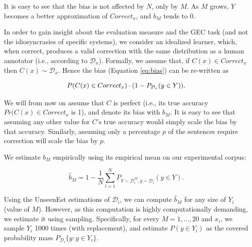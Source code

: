 \documentclass[letter,11pt]{article}
\begin{document}
It is easy to see that the bias is not affected by $N$, only by $M$.
As $M$ grows, $Y$ becomes a better approximation of $Correct_x$, and $b_M$ tends to 0.

In order to gain insight about the evaluation measure and the GEC task
(and not the idiosyncrasies of specific systems), we consider an idealized learner,
which, when correct, produces a valid correction with the same
distribution as a human annotator (i.e., according to $\mathcal{D}_x$).
Formally, we assume that, if $C(x) \in Correct_x$ then $C(x) \sim \mathcal{D}_x$.
Hence the bias (Equation \ref{eq:bias}) can be re-written as

\begin{small}
\begin{equation}
  \centering
  P(C(x) \in Correct_x) \cdot (1 - P_{\mathcal{D}_x}(y \in Y)).
\end{equation}
\end{small}

We will from now on assume that $C$ is perfect (i.e., its true accuracy $Pr(C(x) \in Correct_x$ is 1),
and denote its bias with $b_M$.
It is easy to see that assuming any other value for $C$'s true accuracy
would simply scale the bias by that accuracy.
Similarly, assuming only a percentage $p$ of the sentences require correction
will scale the bias by $p$.



We estimate $b_M$ empirically using its empirical mean on our experimental corpus:

\begin{small}
  \begin{equation}
    \hat{b}_M = 1 - \frac{1}{N}\sum_{i=1}^N P_{Y \sim \mathcal{D}_i^M, y \sim \mathcal{D}_i}\left(y \in Y\right).
  \end{equation}
\end{small}

Using the {\sc UnseenEst} estimations of $\mathcal{D}_i$, we can compute $\hat{b}_M$
for any size of $Y_i$ (value of $M$). 
However, as this computation is highly computationally demanding, we estimate it using
sampling. Specifically, for every $M = 1,...,20$ and $x_i$, we sample $Y_i$ 1000 times
(with replacement), and estimate $P\left(y \in Y_i\right)$ as the covered probability mass
$P_{\mathcal{D}_i}\{y: y \in Y_i\}$.
\end{document}
